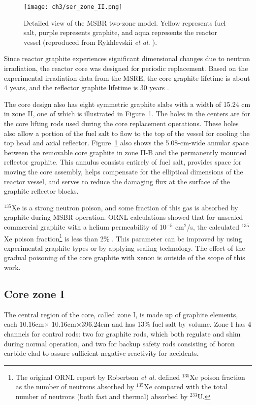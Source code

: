 \begin{figure}[htb!] %
	\texttt{[image: ch3/ser\_zone\_II.png]}
	\caption{Detailed view of the \gls{MSBR} two-zone model. 
		Yellow represents fuel salt, purple represents graphite, and aqua 
		represents the reactor vessel (reproduced from Rykhlevskii 
		\emph{et al.} \cite{rykhlevskii_modeling_2019}).}
	\label{fig:serpent_zoneII}
\end{figure}

Since reactor graphite experiences significant dimensional changes due to 
neutron irradiation, the reactor core was designed for periodic replacement. 
Based on the experimental irradiation data from the \gls{MSRE}, the core 
graphite lifetime is about 4 years, and the reflector graphite lifetime is 30 
years \cite{robertson_conceptual_1971}.

The core design also has eight symmetric graphite slabs with a width of 15.24 
cm in zone II, one of which is illustrated in Figure~\ref{fig:serpent_zoneII}. 
The holes in the centers are for the core lifting rods used during the core 
replacement operations. These holes also allow a portion of the fuel salt to 
flow to the top of the vessel for cooling the top head and axial reflector.  
Figure~\ref{fig:serpent_zoneII} also shows the 5.08-cm-wide annular 
space between the removable core graphite in zone II-B and the permanently 
mounted reflector graphite. This annulus consists entirely of fuel salt, 
provides space for moving the core assembly, helps compensate for the 
elliptical dimensions of the reactor vessel, and serves to reduce the damaging 
flux at the surface of the graphite reflector blocks. 

$^{135}$Xe is a strong neutron poison, and some fraction of this gas is  
absorbed by graphite during \gls{MSBR} operation. ORNL calculations showed 
that for unsealed commercial graphite with a helium permeability of 10$^{-5}$ 
cm$^2$/s, the calculated $^{135}$Xe poison fraction\footnote{The original ORNL 
report by Robertson \emph{et al.} defined $^{135}$Xe poison fraction as the 
number of neutrons absorbed by $^{135}$Xe compared with the total number of 
neutrons (both fast and thermal) absorbed by $^{233}$U.} is less than 2\%
\cite{robertson_conceptual_1971}. This parameter can be improved by using 
experimental graphite types or by applying sealing technology. The effect of 
the gradual poisoning of the core graphite with xenon is outside of the scope 
of this work.

\subsection{Core zone I}
The central region of the core, called zone I, is made up of graphite 
elements, each $10.16$cm$\times$ 10.16cm$\times$396.24cm and has 13\% fuel 
salt by volume. Zone I has 4 
channels for control rods: two for graphite rods, which both regulate and shim 
during normal operation, and two for backup safety rods consisting of boron 
carbide clad to assure sufficient negative reactivity for accidents.

